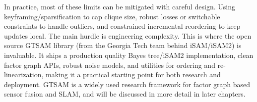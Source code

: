 In practice, most of these limits can be mitigated with careful design. Using keyframing/sparsification to cap clique size, robust losses or switchable constraints to handle outliers, and constrained incremental reordering to keep updates local. The main hurdle is engineering complexity. This is where the open source GTSAM library (from the Georgia Tech team behind iSAM/iSAM2) is invaluable. It ships a production quality Bayes tree/iSAM2 implementation, clean factor graph APIs, robust noise models, and utilities for ordering and re-linearization, making it a practical starting point for both research and deployment. GTSAM is a widely used research framework for factor graph based sensor fusion and SLAM, and will be discussed in more detail in later chapters.

